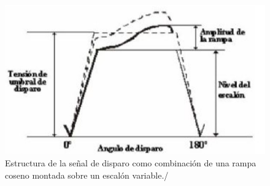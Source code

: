 \documentclass{article}
\begin{document}
\begin{figure}[h]
 \begin{center}
	\includegraphics[scale=0.8]{imagenes/fig8.jpg} 
	\caption{Estructura de la señal de disparo como combinación de una rampa coseno montada sobre un escalón variable./ }\label{fig:fig8}
 \end{center}
\end{figure}
\end{document}

